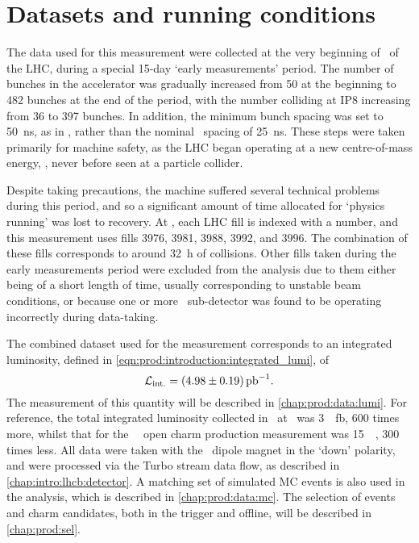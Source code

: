 \chapter{Datasets and running conditions}
\label{chap:prod:data}

The data used for this measurement were collected at the very beginning of 
\runtwo\ of the \ac{LHC}, during a special 15-day `early measurements' period.
The number of bunches in the accelerator was gradually increased from 50 at the 
beginning to 482 bunches at the end of the period, with the number colliding at 
IP8 increasing from 36 to 397 bunches.
In addition, the minimum bunch spacing was set to \SI{50}{\nano\second}, as in 
\runone, rather than the nominal \runtwo\ spacing of \SI{25}{\nano\second}.
These steps were taken primarily for machine safety, as the \ac{LHC} began 
operating at a new centre-of-mass energy, , never before seen at a 
particle collider.

Despite taking precautions, the machine suffered several technical problems 
during this period, and so a significant amount of time allocated for `physics 
running' was lost to recovery.
At \lhcb, each \ac{LHC} fill is indexed with a number, and this measurement 
uses fills 3976, 3981, 3988, 3992, and 3996.
The combination of these fills corresponds to around \SI{32}{\hour} of 
collisions.
Other fills taken during the early measurements period were excluded from the 
analysis due to them either being of a short length of time, usually 
corresponding to unstable beam conditions, or because one or more \lhcb\ 
sub-detector was found to be operating incorrectly during data-taking.

The combined dataset used for the measurement corresponds to an integrated 
luminosity, defined in \cref{eqn:prod:introduction:integrated_lumi}, of
\begin{equation}
  \intlumi = \SI{\xsectotlumi}{\per\pico\barn}.
  \label{eqn:prod:xsectotlumi}
\end{equation}
The measurement of this quantity will be described in 
\cref{chap:prod:data:lumi}.
For reference, the total integrated luminosity collected in \runone\ at \lhcb\ 
was \SI{3}{\per\femto\barn}, 600 times more, whilst that for the \ 
\lhcb\ open charm production measurement was \SI{15}{\per\nb}, 300 times less.
All data were taken with the \lhcb\ dipole magnet in the `down' polarity, and 
were processed via the Turbo stream data flow, as described in 
\cref{chap:intro:lhcb:detector}.
A matching set of simulated \ac{MC} events is also used in the analysis, which 
is described in \cref{chap:prod:data:mc}.
The selection of events and charm candidates, both in the trigger and offline, 
will be described in \cref{chap:prod:sel}.

